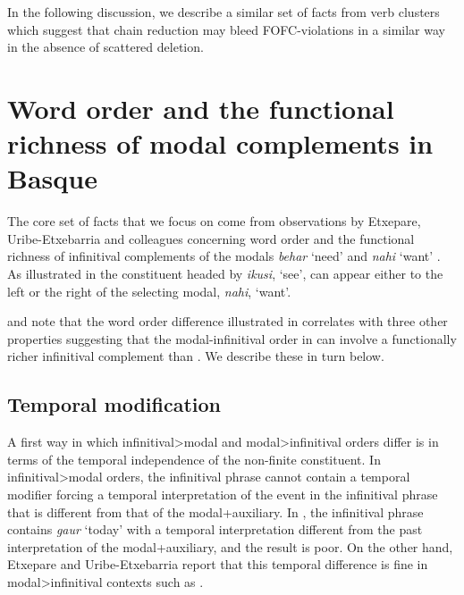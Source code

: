 \documentclass[output=paper]{langscibook}
\begin{document}
In the following discussion, we describe a similar set of facts from  verb clusters which suggest that chain reduction may bleed FOFC-violations in a similar way in the absence of scattered deletion.

\section{Word order and the functional richness of modal complements in Basque}\label{sec:haddican:3}

The core set of facts that we focus on come from observations by Etxepare, Uribe-Etxe\-bar\-ria and colleagues concerning word order and the functional richness of infinitival complements of the modals  \textit{behar} `need' and \textit{nahi} `want' \citep{etxepare-uribeetxebarria2009, etxepare-uribeetxebarria2012, balza2010}.  As illustrated in  the constituent headed by \textit{ikusi}, `see', can appear either to the left or the right of the selecting modal, \textit{nahi}, `want'.  

\ea\protect\label{E-UE-2}\label{ex:haddican:18}
\z\z
 
\cite{etxepare-uribeetxebarria2009, etxepare-uribeetxebarria2012} and \cite{balza2010} note that the word order difference illustrated in  correlates with three other properties suggesting that the modal-infinitival order in  can involve a functionally richer infinitival complement than .  We describe these in  turn below.

\subsection{Temporal modification}

A first way in which in\-fin\-i\-ti\-val>mo\-dal and mo\-dal>in\-fin\-i\-ti\-val orders differ is in terms of the temporal independence of the non-finite constituent.  In in\-fin\-i\-ti\-val>mo\-dal orders, the infinitival phrase cannot contain a temporal modifier forcing a temporal interpretation of the event in the infinitival phrase that is different from that of the modal+auxiliary.  In , the infinitival phrase contains \textit{gaur} `today' with a temporal interpretation different from the past interpretation of the modal+auxiliary, and the result is poor.  On the other hand, Etxepare and Uribe-Etxebarria report that this temporal difference is fine in mo\-dal>in\-fin\-i\-ti\-val contexts such as .
\end{document}
